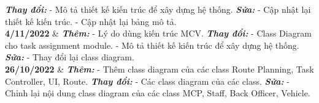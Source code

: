 \begin{tblr}
                            \textbf{\textit{Thay đổi:}} \newline
                            - Mô tả thiết kế kiến trúc để xây dựng hệ thống. \newline
                            \textbf{\textit{Sửa:}} \newline
                            - Cập nhật lại thiết kế kiến trúc.\newline
                            - Cập nhật lại bảng mô tả.\\
        \textbf{4/11/2022} & \textbf{\textit{Thêm:}}\newline
                            - Lý do dùng kiến trúc MCV.
                            \textbf{\textit{Thay đổi:}} \newline
                            - Class Diagram cho task assignment module. \newline
                            - Mô tả thiết kế kiến trúc để xây dựng hệ thống. \newline
                            \textbf{\textit{Sửa:}} \newline
                            - Thay đổi lại class diagram. \\
        \textbf{26/10/2022} & \textbf{\textit{Thêm:}}\newline
                            - Thêm class diagram của các class Route Planning, Task Controller, UI, Route. \newline
                            \textbf{\textit{Thay đổi:}} \newline
                            - Các class diagram của các class. \newline
                            \textbf{\textit{Sửa:}} \newline
                            - Chỉnh lại nội dung class diagram của các class MCP, Staff, Back Officer, Vehicle. \\
    \end{tblr}


